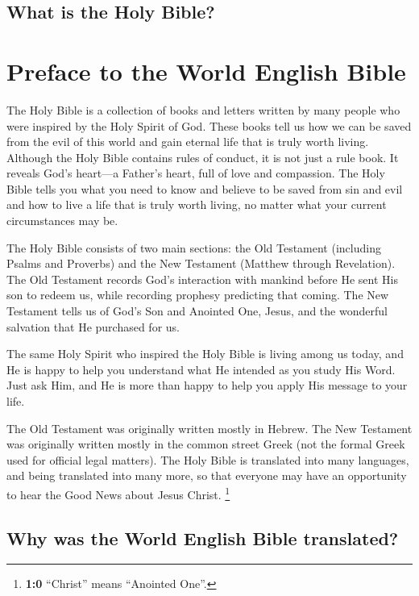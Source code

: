 \hypertarget{what-is-the-holy-bible}{%
\subsection{What is the Holy Bible?}\label{what-is-the-holy-bible}}

\hypertarget{preface-to-the-world-english-bible}{%
\section{Preface to the World English
Bible}\label{preface-to-the-world-english-bible}}

The Holy Bible is a collection of books and letters written by many
people who were inspired by the Holy Spirit of God. These books tell us
how we can be saved from the evil of this world and gain eternal life
that is truly worth living. Although the Holy Bible contains rules of
conduct, it is not just a rule book. It reveals God's heart---a Father's
heart, full of love and compassion. The Holy Bible tells you what you
need to know and believe to be saved from sin and evil and how to live a
life that is truly worth living, no matter what your current
circumstances may be.

The Holy Bible consists of two main sections: the Old Testament
(including Psalms and Proverbs) and the New Testament (Matthew through
Revelation). The Old Testament records God's interaction with mankind
before He sent His son to redeem us, while recording prophesy predicting
that coming. The New Testament tells us of God's Son and Anointed One,
Jesus, and the wonderful salvation that He purchased for us.

The same Holy Spirit who inspired the Holy Bible is living among us
today, and He is happy to help you understand what He intended as you
study His Word. Just ask Him, and He is more than happy to help you
apply His message to your life.

The Old Testament was originally written mostly in Hebrew. The New
Testament was originally written mostly in the common street Greek (not
the formal Greek used for official legal matters). The Holy Bible is
translated into many languages, and being translated into many more, so
that everyone may have an opportunity to hear the Good News about Jesus
Christ. \footnote{\textbf{1:0} ``Christ'' means ``Anointed One''.}

\hypertarget{why-was-the-world-english-bible-translated}{%
\subsection{Why was the World English Bible
translated?}\label{why-was-the-world-english-bible-translated}}


